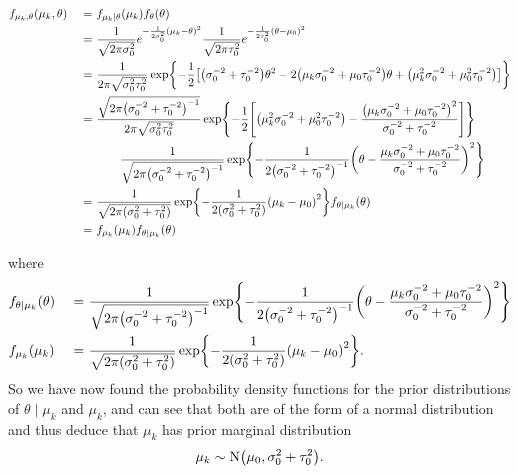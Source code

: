 \documentclass[11pt]{article} %
\let\originalleft\left
\let\originalright\right
\renewcommand{\left}{\mathopen{}\mathclose\bgroup\originalleft}
\renewcommand{\right}{\aftergroup\egroup\originalright}
\begin{document}
\begin{alignat*}{2}
& f_{\mu_k, \theta}\left(\mu_k, \theta\right) &\ =\ & f_{\mu_k\vert \theta}\left(\mu_{k}\right)f_{\theta}\left(\theta\right) \\
& &\ =\ &\frac{1}{\sqrt{2\pi\sigma_0^2}}e^{-\frac{1}{2\sigma_0^{2}}\left(\mu_{k} - \theta\right)^2}\frac{1}{\sqrt{2\pi\tau_0^2}}e^{-\frac{1}{2\tau_0^{2}}\left(\theta - \mu_{0}\right)^2} \\
& &\ =\ &\frac{1}{2\pi\sqrt{\sigma_0^2\tau_0^2}}\exp\left\{ -\frac{1}{2}\left[\left(\sigma_0^{-2}+\tau_0^{-2}\right)\theta^2  -2\left(\mu_k\sigma_0^{-2}+\mu_0\tau_0^{-2}\right)\theta +\left(\mu_k^2\sigma_0^{-2}+\mu_0^2\tau_0^{-2}\right) \right] \right\} \\
& &\ =\ & \frac{\sqrt{2\pi\left(\sigma_0^{-2}+\tau_0^{-2}\right)^{-1}}}{2\pi\sqrt{\sigma_0^2\tau_0^2}}\exp\left\{-\frac{1}{2}\left[ \left(\mu_k^2\sigma_0^{-2}+\mu_0^2\tau_0^{-2}\right) - \frac{\left( \mu_k\sigma_0^{-2}+\mu_0\tau_0^{-2} \right)^2}{\sigma_0^{-2}+\tau_0^{-2}} \right]\right\} \\
&&& \qquad\frac{1}{\sqrt{2\pi\left(\sigma_0^{-2}+\tau_0^{-2}\right)^{-1}}}\exp\left\{-\frac{1}{2\left(\sigma_0^{-2}+\tau_0^{-2}\right)^{-1}}\left(\theta - \frac{\mu_k\sigma_0^{-2}+\mu_0\tau_0^{-2}}{\sigma_0^{-2}+\tau_0^{-2}}\right)^2\right\} \\
& &\ =\ & \frac{1}{\sqrt{2\pi\left(\sigma_0^{2}+\tau_0^{2}\right)}}\exp\left\{ -\frac{1}{2\left(\sigma_0^{2}+\tau_0^{2}\right)}\left(\mu_k - \mu_0\right)^2 \right\}f_{\theta\mid\mu_k}\left(\theta\right) \\
& &\ =\ & f_{\mu_k}\left(\mu_k\right)f_{\theta\mid\mu_k}\left(\theta\right)
\end{alignat*}

where
\begin{alignat*}{2}
	& f_{\theta\mid\mu_k}\left(\theta\right) &\ =\ & \frac{1}{\sqrt{2\pi\left(\sigma_0^{-2}+\tau_0^{-2}\right)^{-1}}}\exp\left\{-\frac{1}{2\left(\sigma_0^{-2}+\tau_0^{-2}\right)^{-1}}\left(\theta - \frac{\mu_k\sigma_0^{-2}+\mu_0\tau_0^{-2}}{\sigma_0^{-2}+\tau_0^{-2}}\right)^2\right\}\\
	& f_{\mu_k}\left(\mu_k\right) &\ =\ & \frac{1}{\sqrt{2\pi\left(\sigma_0^{2}+\tau_0^{2}\right)}}\exp\left\{ -\frac{1}{2\left(\sigma_0^{2}+\tau_0^{2}\right)}\left(\mu_k - \mu_0\right)^2 \right\}.
\end{alignat*}
So we have now found the probability density functions for the prior distributions of $\theta\mid\mu_k$ and $\mu_k$, and can see that both are of the form of a normal distribution and thus deduce that $\mu_k$ has prior marginal distribution
\begin{equation*}
	\mu_k \sim \mbox{N}\left(\mu_0, \sigma_0^2 + \tau_0^2\right).
\end{equation*}
\end{document}
